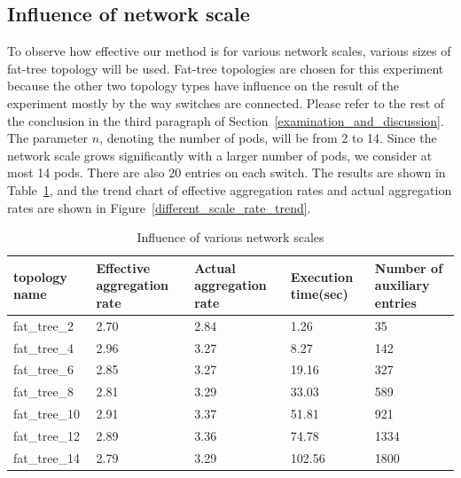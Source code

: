 \subsection{Influence of network scale}
To observe how effective our method is for various network scales, various sizes of fat-tree topology will be used. Fat-tree topologies are chosen for this experiment because the other two topology types have influence on the result of the experiment mostly by the way switches are connected. Please refer to the rest of the conclusion in the third paragraph of Section~\ref{examination_and_discussion}. The parameter $n$, denoting the number of pods, will be from 2 to 14. Since the network scale grows significantly with a larger number of pods, we consider at most 14 pods. There are also 20 entries on each switch. The results are shown in Table~\ref{table:different_scale}, and the trend chart of effective aggregation rates and actual aggregation rates are shown in Figure~\ref{different_scale_rate_trend}.

\begin{table}
\centering
\caption{Influence of various network scales}
\begin{tabular}{|l|p{2.5cm}|p{2.5cm}|p{1.9cm}|p{2.8cm}|}
\hline topology name & Effective aggregation rate & Actual aggregation rate & Execution time(sec) & Number of auxiliary entries \\
\hline
\hline fat\_tree\_2 & 2.70 & 2.84 & 1.26 & 35 \\
\hline fat\_tree\_4 & 2.96 & 3.27 & 8.27 & 142 \\
\hline fat\_tree\_6 & 2.85 & 3.27 & 19.16 & 327 \\
\hline fat\_tree\_8 & 2.81 & 3.29 & 33.03 & 589 \\
\hline fat\_tree\_10 & 2.91 & 3.37 & 51.81 & 921 \\
\hline fat\_tree\_12 & 2.89 & 3.36 & 74.78 & 1334 \\
\hline fat\_tree\_14 & 2.79 & 3.29 & 102.56 & 1800 \\
\hline
\end{tabular}
\label{table:different_scale}
\end{table}

